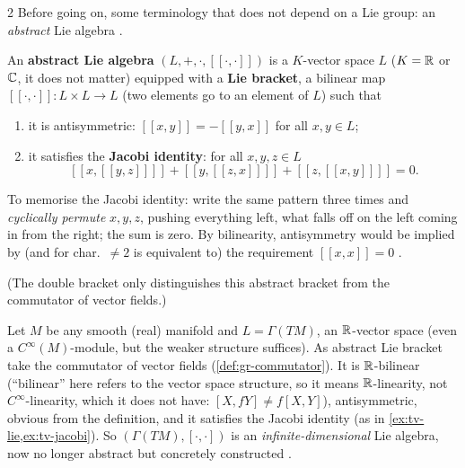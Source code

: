 \begin{paracol}{2}
Before going on, some terminology that does not depend on a Lie group: an \emph{abstract} Lie algebra  .
\begin{definition}\label{def:ll-lie-algebra}
An \textbf{abstract Lie algebra} $(L,+,\cdot,[\![\cdot,\cdot]\!])$ is a $K$-vector space $L$ ($K=\mathbb{R}$ or $\mathbb{C}$, it does not matter) equipped with a \textbf{Lie bracket}, a bilinear map $[\![\cdot,\cdot]\!]\colon L\times L\to L$ (two elements go to an element of $L$) such that
\begin{enumerate}
  \item[(i)] it is antisymmetric: $[\![x,y]\!]=-[\![y,x]\!]$ for all $x,y\in L$;
  \item[(ii)] it satisfies the \textbf{Jacobi identity}: for all $x,y,z\in L$
  \[
    [\![x,[\![y,z]\!]]\!]+[\![y,[\![z,x]\!]]\!]+[\![z,[\![x,y]\!]]\!]=0.
  \]
\end{enumerate}
To memorise the Jacobi identity: write the same pattern three times and \emph{cyclically permute} $x,y,z$, pushing everything left, what falls off on the left coming in from the right; the sum is zero. By bilinearity, antisymmetry would be implied by (and for char.\ $\ne2$ is equivalent to) the requirement $[\![x,x]\!]=0$     .
\end{definition}
(The double bracket only distinguishes this abstract bracket from the commutator of vector fields.)

\begin{example}\label{ex:ll-vf-algebra}
Let $M$ be any smooth (real) manifold and $L=\Gamma(TM)$, an $\mathbb{R}$-vector space (even a $C^\infty(M)$-module, but the weaker structure suffices). As abstract Lie bracket take the commutator of vector fields (\cref{def:gr-commutator}). It is $\mathbb{R}$-bilinear (``bilinear'' here refers to the vector space structure, so it means $\mathbb{R}$-linearity, not $C^\infty$-linearity, which it does not have: $[X,fY]\ne f[X,Y]$), antisymmetric, obvious from the definition, and it satisfies the Jacobi identity (as in \cref{ex:tv-lie,ex:tv-jacobi}). So $(\Gamma(TM),[\cdot,\cdot])$ is an \emph{infinite-dimensional} Lie algebra, now no longer abstract but concretely constructed      .
\end{example}


\end{paracol}

